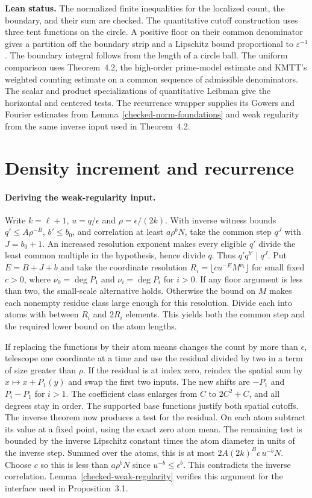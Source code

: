 \noindent\textbf{Lean status.} The normalized finite inequalities for
the localized count, the boundary, and their sum are checked. The
quantitative cutoff construction uses three tent functions on the circle.
A positive floor on their common denominator gives a partition off the
boundary strip and a Lipschitz bound proportional to $\varepsilon^{-1}$.
The boundary integral follows from the length of a circle ball.
The uniform comparison uses Theorem~4.2, the high-order prime-model
estimate and KMTT's weighted counting estimate on a common sequence
of admissible denominators. The scalar and product specializations of
quantitative Leibman give the horizontal and centered tests. The
recurrence wrapper supplies its Gowers and Fourier estimates from
Lemma~\ref{checked-norm-foundations} and weak regularity from the
same inverse input used in Theorem~4.2.

\section{Density increment and recurrence}

\paragraph{Deriving the weak-regularity input.}
Write $k=\ell+1$, $u=q/\epsilon$ and
$\rho=\epsilon/(2k)$. With inverse witness bounds
$q'\le A\rho^{-B}$, $b'\le b_0$, and correlation at least
$a\rho^b N$, take the common step $q^J$ with $J=b_0+1$.
An increased resolution exponent makes every eligible $q'$ divide
the least common multiple in the hypothesis, hence divide $q$.
Thus $q'q^{b'}\mid q^J$. Put $E=B+J+b$ and take the coordinate
resolution $R_i=\lfloor c u^{-E}M^{\nu_i}\rfloor$ for small fixed
$c>0$, where $\nu_0=\deg P_1$ and $\nu_i=\deg P_i$ for $i>0$.
If any floor argument is less than two, the small-scale alternative
holds. Otherwise the bound on $M$ makes each nonempty residue
class large enough for this resolution. Divide each into atoms with
between $R_i$ and $2R_i$ elements. This yields both the common
step and the required lower bound on the atom lengths.

If replacing the functions by their atom means changes the count
by more than $\epsilon$, telescope one coordinate at a time and use
the residual divided by two in a term of size greater than $\rho$.
If the residual is at index zero, reindex the spatial sum by
$x\mapsto x+P_1(y)$ and swap the first two inputs. The new shifts are
$-P_1$ and $P_i-P_1$ for $i>1$. The coefficient class enlarges
from $C$ to $2C^2+C$, and all degrees stay in order. The supported
base functions justify both spatial cutoffs. The inverse theorem
now produces a test for the residual. On each atom subtract its
value at a fixed point, using the exact zero atom mean. The remaining
test is bounded by the inverse Lipschitz constant times the atom
diameter in units of the inverse step. Summed over the atoms, this
is at most $2A(2k)^B c\,u^{-b}N$. Choose $c$ so this is less than
$a\rho^b N$ since $u^{-b}\le\epsilon^b$. This contradicts the
inverse correlation. Lemma~\ref{checked-weak-regularity} verifies
this argument for the interface used in Proposition~3.1.

